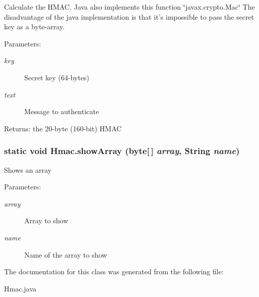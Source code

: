 Calculate the HMAC. Java also implements this function \char`\"{}javax.crypto.Mac\char`\"{} The disadvantage of the java implementation is that it's impossible to pass the secret key as a byte-array. \begin{Desc}
\item[Parameters:]
\begin{description}
\item[{\em key}]Secret key (64-bytes) \item[{\em text}]Message to authenticate \end{description}
\end{Desc}
\begin{Desc}
\item[Returns:]the 20-byte (160-bit) HMAC \end{Desc}
\hypertarget{class_hmac_g2}{
\subsubsection[showArray]{\setlength{\rightskip}{0pt plus 5cm}static void Hmac.show\-Array (byte\mbox{[}$\,$\mbox{]} {\em array}, String {\em name})}}
\label{class_hmac_g2}


Shows an array \begin{Desc}
\item[Parameters:]
\begin{description}
\item[{\em array}]Array to show \item[{\em name}]Name of the array to show \end{description}
\end{Desc}


The documentation for this class was generated from the following file:\begin{CompactItemize}
\item 
Hmac.java\end{CompactItemize}
